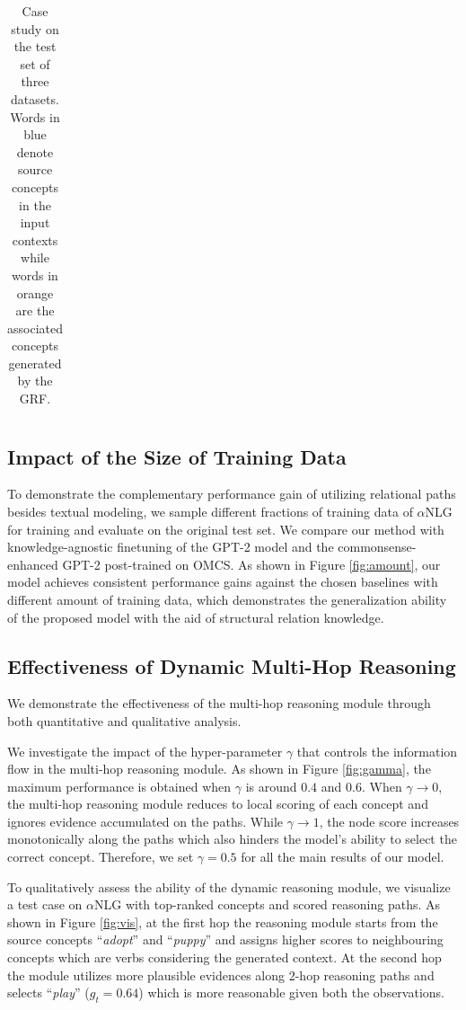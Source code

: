 \documentclass[11pt,a4paper]{article}
\begin{document}
\begin{table}[!t]
{\begin{tabular}{l l}
        \bottomrule[1.5pt]
    \end{tabular}}
    \caption{Case study on the test set of three datasets. Words in  \textcolor{myblue}{blue} denote source concepts in the input contexts while words in \textcolor{myorange}{orange} are the associated concepts generated by the GRF. }
    \label{tab:case_study}
\end{table}

\subsection{Impact of the Size of Training Data}

To demonstrate the complementary performance gain of utilizing relational paths besides textual modeling, we sample different fractions of training data of $\alpha$NLG for training and evaluate on the original test set. We compare our method with knowledge-agnostic finetuning of the GPT-2 model and the commonsense-enhanced GPT-2 post-trained on OMCS. As shown in Figure \ref{fig:amount}, our model achieves consistent performance gains against the chosen baselines with different amount of training data, which demonstrates the generalization ability of the proposed model with the aid of structural relation knowledge.



\subsection{Effectiveness of Dynamic Multi-Hop Reasoning}

We demonstrate the effectiveness of the multi-hop reasoning module through both quantitative and qualitative analysis. 

We investigate the impact of the hyper-parameter $\gamma$ that controls the information flow in the multi-hop reasoning module. 
As shown in Figure \ref{fig:gamma}, the maximum performance is obtained when $\gamma$ is around $0.4$ and $0.6$. When $\gamma\rightarrow 0$, the multi-hop reasoning module reduces to local scoring of each concept and ignores evidence accumulated on the paths. While $\gamma\rightarrow 1$,
the node score increases monotonically along the paths %
which also hinders the model's ability to select the correct concept. Therefore, we set $\gamma=0.5$ for all the main results of our model.

To qualitatively assess the ability of the dynamic reasoning module, we visualize a test case on $\alpha$NLG with top-ranked concepts and scored reasoning paths. As shown in Figure \ref{fig:vis}, at the first hop the reasoning module starts from the source concepts ``\textit{adopt}'' and ``\textit{puppy}'' and assigns higher scores to neighbouring concepts which are verbs considering the generated context. At the second hop the module utilizes more plausible evidences along 2-hop reasoning paths and selects ``\textit{play}'' ($g_t=0.64$) which is more reasonable given both the observations.
\end{document}
